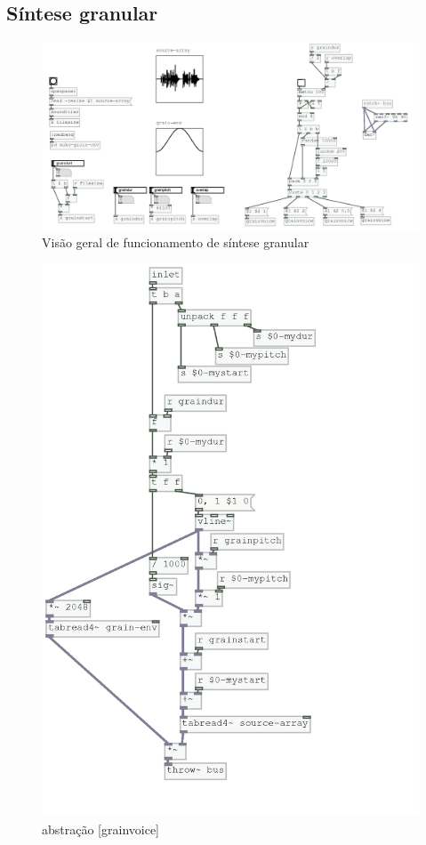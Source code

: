 \documentclass[draft]{ppgmus}
\begin{document}

\subsection{Síntese granular}


\begin{figure}
\includegraphics[scale=.6]{granular-geral}
\caption{Visão geral de funcionamento de síntese granular}
\label{granular-geral}
\end{figure}

\begin{figure}
\includegraphics[scale=.6]{granular2}
\caption{abstração [grainvoice]}
\label{granular2}
\end{figure}
\end{document}
